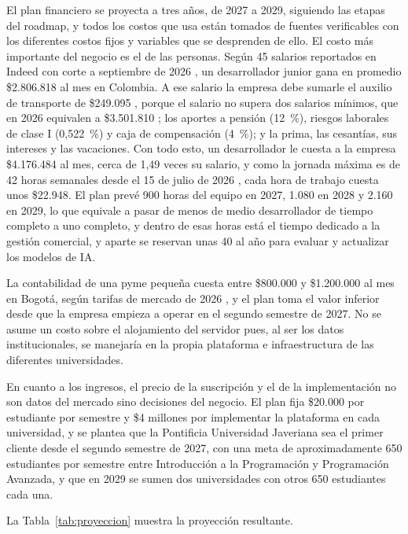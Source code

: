 \documentclass[letterpaper, 10 pt, conference]{ieeeconf}
\begin{document}
El plan financiero se proyecta a tres años, de 2027 a 2029, siguiendo las etapas del roadmap, y todos los costos que usa están tomados de fuentes verificables con los diferentes costos fijos y variables que se desprenden de ello.
El costo más importante del negocio es el de las personas. Según 45 salarios reportados en Indeed con corte a septiembre de 2026 \cite{30}, un desarrollador junior gana en promedio \$2.806.818 al mes en Colombia.
A ese salario la empresa debe sumarle el auxilio de transporte de \$249.095 \cite{32}, porque el salario no supera dos salarios mínimos, que en 2026 equivalen a \$3.501.810 \cite{31}; los aportes a pensión (12~\%), riesgos laborales de clase I (0,522~\%) y caja de compensación (4~\%); y la prima, las cesantías, sus intereses y las vacaciones.
Con todo esto, un desarrollador le cuesta a la empresa \$4.176.484 al mes, cerca de 1,49 veces su salario, y como la jornada máxima es de 42 horas semanales desde el 15 de julio de 2026 \cite{33}, cada hora de trabajo cuesta unos \$22.948.
El plan prevé 900 horas del equipo en 2027, 1.080 en 2028 y 2.160 en 2029, lo que equivale a pasar de menos de medio desarrollador de tiempo completo a uno completo, y dentro de esas horas está el tiempo dedicado a la gestión comercial, y aparte se reservan unas 40 al año para evaluar y actualizar los modelos de IA.

La contabilidad de una pyme pequeña cuesta entre \$800.000 y \$1.200.000 al mes en Bogotá, según tarifas de mercado de 2026 \cite{34}, y el plan toma el valor inferior desde que la empresa empieza a operar en el segundo semestre de 2027. No se asume un costo sobre el alojamiento del servidor pues, al ser los datos institucionales, se manejaría en la propia plataforma e infraestructura de 
las diferentes universidades.

En cuanto a los ingresos, el precio de la suscripción y el de la implementación no son datos del mercado sino decisiones del negocio.
El plan fija \$20.000 por estudiante por semestre y \$4 millones por implementar la plataforma en cada universidad, y se plantea que la Pontificia Universidad Javeriana sea el primer cliente desde el segundo semestre de 2027, con una meta de aproximadamente 650 estudiantes por semestre entre Introducción a la Programación y Programación Avanzada, y que en 2029 se sumen dos universidades con otros 650 estudiantes cada una.

La Tabla~\ref{tab:proyeccion} muestra la proyección resultante.
\end{document}
